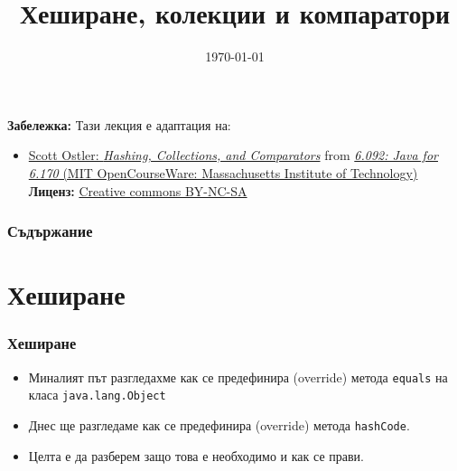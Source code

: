 \documentclass[ignorenonframetext, hyperref=unicode,compress]{beamer}
\title{Хеширане, колекции и компаратори}
\date{\today}
\begin{document}
\frame{\titlepage}

\begin{frame}
\small
{\bf Забележка:} Тази лекция е адаптация на:
\begin{itemize}
  \item \href{http://ocw.mit.edu/NR/rdonlyres/Electrical-Engineering-and-Computer-Science/6-092January--IAP--2006/66BAC837-433E-48A5-BA15-B766E0B7CDEA/0/lecture3.pdf}{Scott Ostler: {\em Hashing, Collections, and Comparators}} from
\href{http://ocw.mit.edu/OcwWeb/Electrical-Engineering-and-Computer-Science/6-092January--IAP--2006/CourseHome/index.htm}{
{\em 6.092: Java for 6.170} (MIT OpenCourseWare:
Massachusetts Institute of Technology)}\\
{\bf Лиценз:}
\href{http://ocw.mit.edu/OcwWeb/web/terms/terms/index.htm\#cc}{Creative commons
BY-NC-SA}

\end{itemize}

\end{frame}
\begin{frame}
\frametitle{Съдържание}
\tableofcontents %
\end{frame}



\section{Хеширане}

\begin{frame}[containsverbatim]\frametitle{Хеширане}
\begin{itemize}
 \item Миналият път разгледахме как се предефинира (override) метода \lstinline{equals} на класа \lstinline{java.lang.Object}
 \item Днес ще разгледаме как се предефинира (override) метода \lstinline{hashCode}.
 \item Целта е да разберем защо това е необходимо и как се прави.
\end{itemize}
\end{frame}
\end{document}
